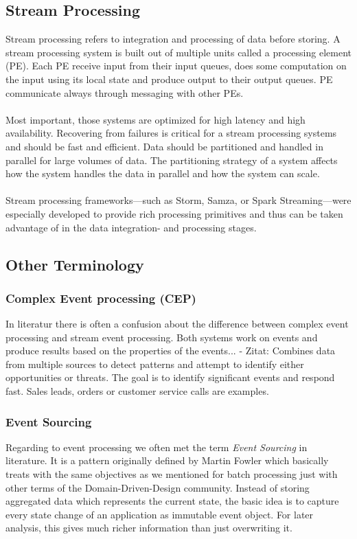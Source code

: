 \subsection{Stream Processing}
\label{intro-datastream-streamprocessing}
Stream processing refers to integration and processing of data before storing. 
A stream processing system is built out of multiple units called a processing
element (PE). Each PE receive input from their input queues, does some
computation on the input using its local state and produce output to their
output queues. PE communicate always through messaging with other PEs. 
\\ \\
Most important, those systems are optimized for high latency and high
availability. Recovering from failures is critical for a stream processing
systems and should be fast and efficient. 
Data should be partitioned and handled in parallel for large volumes of data. 
The partitioning strategy of a system  affects how the system
handles the data in parallel and how the system can scale. 
\cite{PrpSvyOfDSPS}
\\ \\
Stream processing frameworks---such as Storm, Samza, or Spark
Streaming---were especially developed to provide rich processing primitives and
thus can be taken advantage of in the data integration- and processing stages.

\subsection{Other Terminology}
\subsubsection{Complex Event processing (CEP)}
In literatur there is often a confusion about the difference between
complex event processing and stream event processing. Both systems work on
events and produce results based on the properties of the events... 
- Zitat: Combines data from multiple sources  to detect patterns and attempt to
identify either opportunities or threats. The goal is to identify significant
events and respond fast. Sales leads, orders or customer service calls are
examples.\\


\subsubsection{Event Sourcing}
\label{event-sourcing}
Regarding to event processing we often met the term \textit{Event Sourcing} in
literature. It is a pattern originally defined by Martin Fowler which basically
treats with the same objectives as we mentioned for batch processing just with
other terms of the Domain-Driven-Design community. Instead of storing aggregated
data which represents the current state, the basic idea is to capture
every state change of an application as immutable event object. For later
analysis, this gives much richer information than just overwriting it. 

